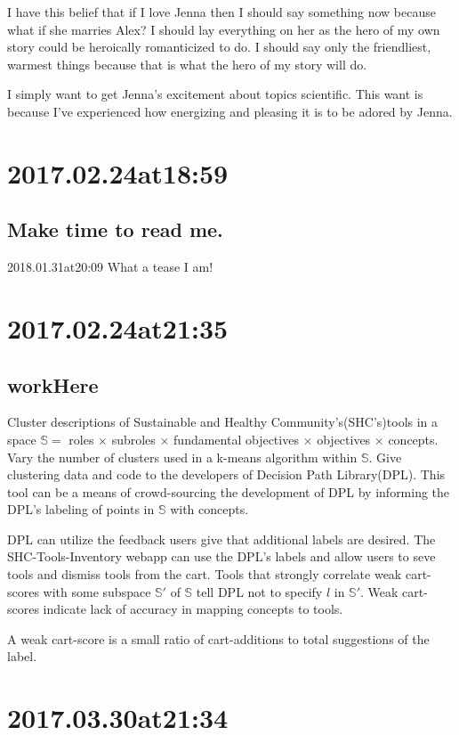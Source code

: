 \begin{enumerate}
\begin{enumerate}
I have this belief that if I love Jenna then I should say something now because what if she marries Alex?
I should lay everything on her as the hero of my own story could be heroically romanticized to do.
I should say only the friendliest, warmest things because that is what the hero of my story will do.

I simply want to get Jenna's excitement about topics scientific.
This want is because I've experienced how energizing and pleasing it is to be adored by Jenna. 

\section*{ 2017.02.24at18:59 }
\subsection*{ Make time to read me. }
2018.01.31at20:09 What a tease I am!

\section*{ 2017.02.24at21:35 }
\subsection*{ workHere }
Cluster descriptions of Sustainable and Healthy Community's(SHC's)tools in a space $\mathbb{S}=$ roles $\times$ subroles $\times$ fundamental objectives $\times$ objectives $\times$ concepts.
Vary the number of clusters used in a k-means algorithm within $\mathbb{S}$.
Give clustering data and code to the developers of Decision Path Library(DPL).
This tool can be a means of crowd-sourcing the development of DPL by informing the DPL's labeling of points in $\mathbb{S}$ with concepts.

DPL can utilize the feedback users give that additional labels are desired.
The SHC-Tools-Inventory webapp can use the DPL's labels and allow users to seve tools and dismiss tools from the cart.
Tools that strongly correlate weak cart-scores with some subspace $\mathbb{S}'$ of $\mathbb{S}$ tell DPL not to specify $l$ in $\mathbb{S}'$.
Weak cart-scores indicate lack of accuracy in mapping concepts to tools. 

A weak cart-score is a small ratio of cart-additions to total suggestions of the label.

\section*{ 2017.03.30at21:34 }

\end{enumerate}
\end{enumerate}
